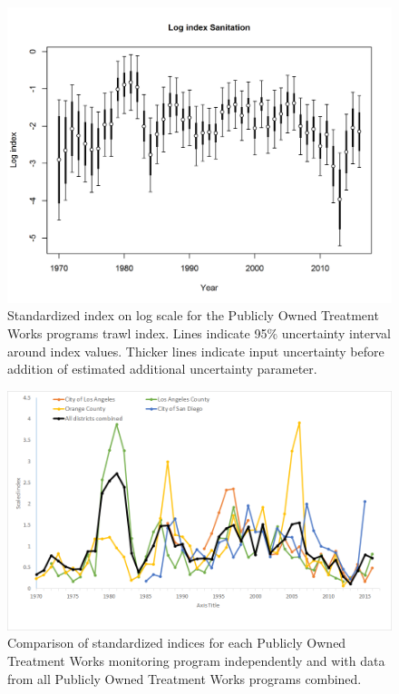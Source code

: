 \documentclass[12pt,]{article}
\begin{document}
\begin{figure}[htbp]
\centering
\includegraphics{r4ss/plots_mod1/index4_logcpuedata_Sanitation.png}
\caption{Standardized index on log scale for the Publicly Owned
Treatment Works programs trawl index. Lines indicate 95\% uncertainty
interval around index values. Thicker lines indicate input uncertainty
before addition of estimated additional uncertainty parameter.
\label{fig:index4_logcpuedata_Sanitation}}
\end{figure}

\begin{figure}[htbp]
\centering
\includegraphics{Figures/Fleet7_Sanitation_indexcompare.png}
\caption{Comparison of standardized indices for each Publicly Owned
Treatment Works monitoring program independently and with data from all
Publicly Owned Treatment Works programs combined.
\label{fig:Fleet7_Sanitation_indexcompare}}
\end{figure}
\end{document}
